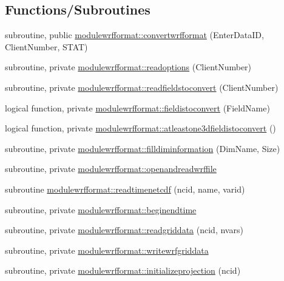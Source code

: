 \subsection*{Functions/\+Subroutines}
\begin{DoxyCompactItemize}
\item 
subroutine, public \mbox{\hyperlink{namespacemodulewrfformat_aa35fbb60f9455409be248675ba032799}{modulewrfformat\+::convertwrfformat}} (Enter\+Data\+ID, Client\+Number, S\+T\+AT)
\item 
subroutine, private \mbox{\hyperlink{namespacemodulewrfformat_a00bbd242b402a9ccd03ef1e1f7c2721e}{modulewrfformat\+::readoptions}} (Client\+Number)
\item 
subroutine, private \mbox{\hyperlink{namespacemodulewrfformat_a6acfc9c1ce2d45f5a0a6187e1e8083f8}{modulewrfformat\+::readfieldstoconvert}} (Client\+Number)
\item 
logical function, private \mbox{\hyperlink{namespacemodulewrfformat_a8116c1c7ac79eeffc8e9a9316b030276}{modulewrfformat\+::fieldistoconvert}} (Field\+Name)
\item 
logical function, private \mbox{\hyperlink{namespacemodulewrfformat_a84c66dd2bcabd5f772f74e52544536f7}{modulewrfformat\+::atleastone3dfieldistoconvert}} ()
\item 
subroutine, private \mbox{\hyperlink{namespacemodulewrfformat_aad3ae96f01cad78355724f71c1705c80}{modulewrfformat\+::filldiminformation}} (Dim\+Name, Size)
\item 
subroutine, private \mbox{\hyperlink{namespacemodulewrfformat_ace4676af115f32ceeda15123d47bd5c8}{modulewrfformat\+::openandreadwrffile}}
\item 
subroutine \mbox{\hyperlink{namespacemodulewrfformat_af33b325d2707c25986c4337ea9954b91}{modulewrfformat\+::readtimenetcdf}} (ncid, name, varid)
\item 
subroutine, private \mbox{\hyperlink{namespacemodulewrfformat_a28558eb5842cfa6977bae48d0fd73c4e}{modulewrfformat\+::beginendtime}}
\item 
subroutine, private \mbox{\hyperlink{namespacemodulewrfformat_a0a9c15502f5f361afd382196884a739d}{modulewrfformat\+::readgriddata}} (ncid, nvars)
\item 
subroutine, private \mbox{\hyperlink{namespacemodulewrfformat_ac70c0a00b2fe8eb641ec2a6846ed4363}{modulewrfformat\+::writewrfgriddata}}
\item 
subroutine, private \mbox{\hyperlink{namespacemodulewrfformat_a4a00c0e3d836f215b0275950c3cc307c}{modulewrfformat\+::initializeprojection}} (ncid)

\end{DoxyCompactItemize}
